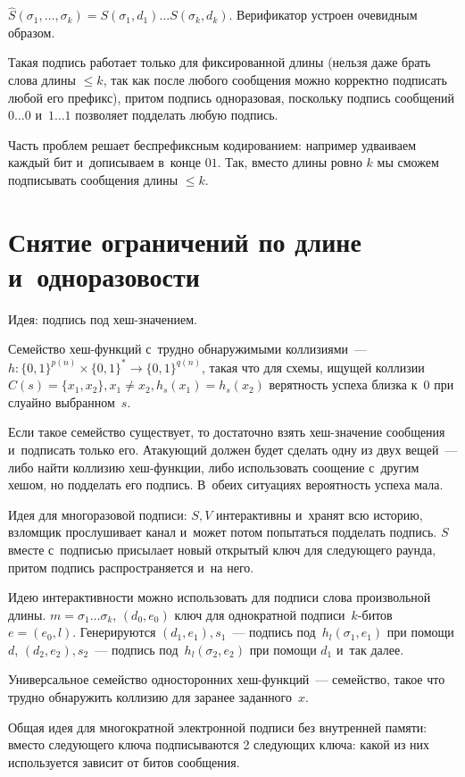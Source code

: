\documentclass{article}
\begin{document}
$\hat S(\sigma_1, \ldots, \sigma_k) = S(\sigma_1, d_1) \ldots S(\sigma_k, d_k)$.
Верификатор устроен очевидным образом.

Такая подпись работает только для фиксированной длины (нельзя даже брать слова
длины $\le k$, так как после любого сообщения можно корректно подписать любой
его префикс), притом подпись одноразовая, поскольку подпись сообщений $0\ldots0$
и~$1\ldots1$ позволяет подделать любую подпись.

Часть проблем решает беспрефиксным кодированием: например удваиваем каждый бит
и~дописываем в~конце $01$. Так, вместо длины ровно $k$ мы сможем подписывать
сообщения длины $\le k$.

\section{Снятие ограничений по длине и~одноразовости}

Идея: подпись под хеш-значением.

\begin{definition}
	Семейство хеш-функций с~трудно обнаружимыми коллизиями~--- $h: \{0, 1\}^{p(n)}
	\times \{0, 1\}^\ast \rightarrow \{0, 1\}^{q(n)}$, такая что для схемы, ищущей
	коллизии $C(s) = \{x_1, x_2\}, x_1 \ne x_2, h_s(x_1) = h_s(x_2)$ верятность
	успеха близка к~0 при слуайно выбранном~$s$.
\end{definition}

Если такое семейство существует, то достаточно взять хеш-значение сообщения
и~подписать только его. Атакующий должен будет сделать одну из двух вещей~---
либо найти коллизию хеш-функции, либо использовать соощение с~другим хешом, но
подделать его подпись. В~обеих ситуациях вероятность успеха мала.

Идея для многоразовой подписи: $S, V$ интерактивны и~хранят всю историю,
взломщик прослушивает канал и~может потом попытаться подделать подпись.
$S$ вместе с~подписью присылает новый открытый ключ для следующего раунда,
притом подпись распространяется и~на него.

Идею интерактивности можно использовать для подписи слова произвольной длины. $m
= \sigma_1 \ldots \sigma_k$, $(d_0, e_0)$ ключ для однократной
подписи~$k$-битов $e = (e_0, l)$.
Генерируются $(d_1, e_1), s_1$~--- подпись под~$h_l(\sigma_1, e_1)$ при помощи
$d$, $(d_2, e_2), s_2$~--- подпись под~$h_l(\sigma_2, e_2)$ при помощи $d_1$
и~так далее.

\begin{definition}
	Универсальное семейство односторонних хеш-функций~--- семейство, такое что
	трудно обнаружить коллизию для заранее заданного~$x$.
\end{definition}

Общая идея для многократной электронной подписи без внутренней памяти: вместо
следующего ключа подписываются 2 следующих ключа: какой из них используется
зависит от битов сообщения.
\end{document}
